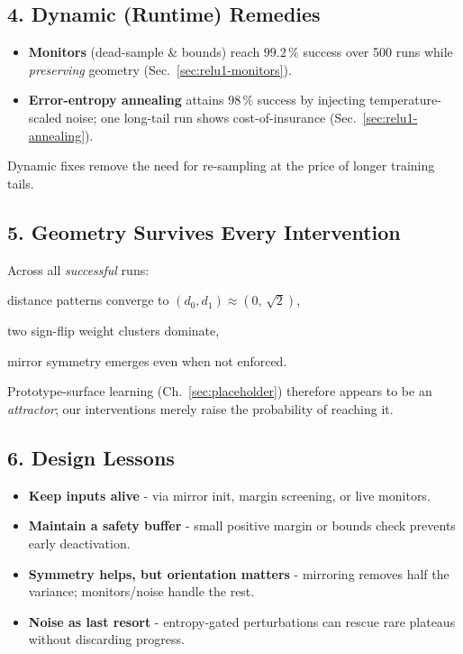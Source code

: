 \subsection*{4.  Dynamic (Runtime) Remedies}
\begin{itemize}
  \item \textbf{Monitors} (dead-sample \& bounds) reach $99.2\,\%$
        success over 500 runs while \emph{preserving} geometry
        (Sec.~\ref{sec:relu1-monitors}).
  \item \textbf{Error-entropy annealing} attains $98\,\%$ success by
        injecting temperature-scaled noise; one long-tail run shows
        cost-of-insurance (Sec.~\ref{sec:relu1-annealing}).
\end{itemize}
Dynamic fixes remove the need for re-sampling at the price of longer
training tails.

\subsection*{5.  Geometry Survives Every Intervention}
Across all \emph{successful} runs:
\begin{enumerate*}[label=(\roman*)]
  \item distance patterns converge to $(d_{0},d_{1})\approx(0,\,\sqrt2)$,
  \item two sign-flip weight clusters dominate,
  \item mirror symmetry emerges even when not enforced.
\end{enumerate*}
Prototype-surface learning (Ch.~\ref{sec:placeholder}) therefore
appears to be an \emph{attractor}; our interventions merely raise the
probability of reaching it.

\subsection*{6.  Design Lessons}
\begin{itemize}
  \item \textbf{Keep inputs alive} - via mirror init, margin screening,
        or live monitors.
  \item \textbf{Maintain a safety buffer} - small positive margin or
        bounds check prevents early deactivation.
  \item \textbf{Symmetry helps, but orientation matters} - mirroring
        removes half the variance; monitors/noise handle the rest.
  \item \textbf{Noise as last resort} - entropy-gated perturbations can
        rescue rare plateaus without discarding progress.
\end{itemize}

